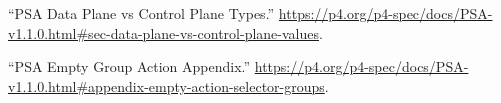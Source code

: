 \documentclass[11pt]{article}
\begin{document}
{{\begin{thebibliography}{37}
\mdbibitemlabel{{}[23]}\textquotedblleft{}PSA Data Plane vs Control Plane Types.\textquotedblright{} \href{https://p4.org/p4-spec/docs/PSA-v1.1.0.html\%23sec-data-plane-vs-control-plane-values}{{\ttfamily https://\hspace{0pt}p4.\hspace{0pt}org/\hspace{0pt}p4-\hspace{0pt}spec/\hspace{0pt}docs/\hspace{0pt}PSA-\hspace{0pt}v1.\hspace{0pt}1.\hspace{0pt}0.\hspace{0pt}html\#\hspace{0pt}sec-\hspace{0pt}data-\hspace{0pt}plane-\hspace{0pt}vs-\hspace{0pt}control-\hspace{0pt}plane-\hspace{0pt}values}}.\label{psatranslation}%

\mdbibitemlabel{{}[24]}\textquotedblleft{}PSA Empty Group Action Appendix.\textquotedblright{} \href{https://p4.org/p4-spec/docs/PSA-v1.1.0.html\%23appendix-empty-action-selector-groups}{{\ttfamily https://\hspace{0pt}p4.\hspace{0pt}org/\hspace{0pt}p4-\hspace{0pt}spec/\hspace{0pt}docs/\hspace{0pt}PSA-\hspace{0pt}v1.\hspace{0pt}1.\hspace{0pt}0.\hspace{0pt}html\#\hspace{0pt}appendix-\hspace{0pt}empty-\hspace{0pt}action-\hspace{0pt}selector-\hspace{0pt}groups}}.\label{psaemptygroupactionappendix}%


\end{thebibliography}}}
\end{document}
